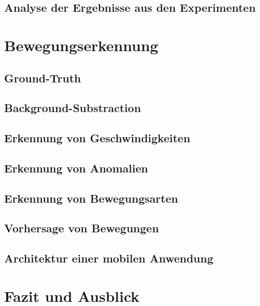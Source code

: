 \documentclass{hsflensburg}
\begin{document}
  \subsection{Analyse der Ergebnisse aus den Experimenten}

  \section{Bewegungserkennung}
  \subsection{Ground-Truth}
  \subsection{Background-Substraction}
  \subsection{Erkennung von Geschwindigkeiten}
  \subsection{Erkennung von Anomalien}
  \subsection{Erkennung von Bewegungsarten}
  \subsection{Vorhersage von Bewegungen}
  \subsection{Architektur einer mobilen Anwendung}

  \section{Fazit und Ausblick}
\end{document}
